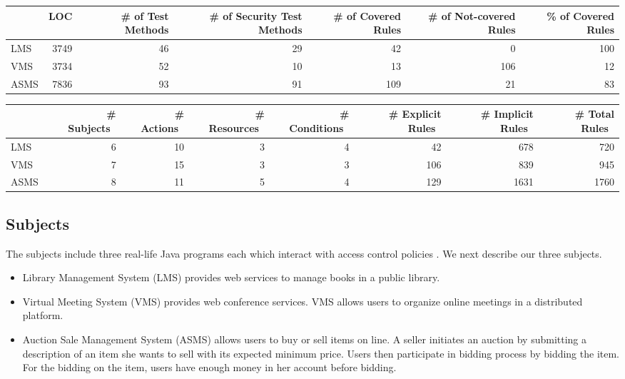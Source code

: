 \begin{table*}[tbp]
  \centering
  	\caption{Subjects}    
    \begin{tabular}{|l|r|r|r|r|r|r|}
    \hline
          & LOC   & \# of Test Methods & \# of Security Test Methods & \# of Covered Rules & \# of Not-covered Rules & \% of Covered Rules \\\hline\hline
    LMS   & 3749  & 46    & 29    & 42    & 0     & 100 \\\hline
    VMS   & 3734  & 52    & 10    & 13    & 106   & 12 \\\hline
    ASMS  & 7836  & 93    & 91    & 109   & 21    & 83 \\\hline
		\end{tabular}%
  \label{tab:subj}%
%
  \centering
  \caption{Access control policies in our subjects}
    \begin{tabular}{|l|r|r|r|r|r|r|r|}
 		\hline
     & ~\# Subjects~ & ~\# Actions~ & ~\# Resources~ & ~\# Conditions~ & ~\# Explicit Rules~ & ~\# Implicit Rules~ & ~\# Total Rules~ \\\hline\hline
    LMS   & 6     & 10    & 3     & 4     & 42    & 678   & 720 \\\hline
    VMS   & 7     & 15    & 3     & 3     & 106   & 839   & 945 \\\hline
    ASMS~  & 8     & 11    & 5     & 4     & 129   & 1631  & 1760 \\\hline
 
    \end{tabular}%
  \label{tab:subjectpolicies}%
\end{table*}%

\subsection{Subjects}
The subjects include three real-life Java programs each which
interact with access control policies \cite{testcase}. We next describe
our three subjects.
\begin{itemize}	
\item Library Management System (LMS) provides web services to manage books in a public library.
\item Virtual Meeting System (VMS) provides web conference services. VMS allows users to organize
online meetings in a distributed platform.
\item Auction Sale Management System (ASMS) allows users to buy or sell items on line. A seller initiates an auction by submitting a description of an item she wants to sell with its expected minimum price. Users then participate in bidding process by
bidding the item. For the bidding on the item, users have enough money in her account before bidding.
\end{itemize}

